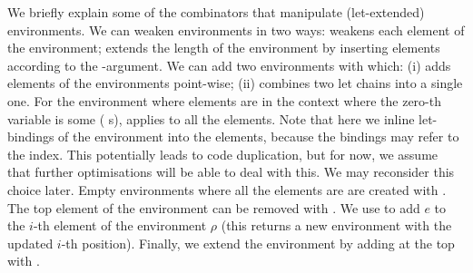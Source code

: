 We briefly explain some of the combinators that manipulate (let-extended) environments.
We can weaken environments in two ways:  weakens each element of the environment;
 extends the length of the environment by inserting 
elements according to the -argument.  We can add two environments with 
which: (i) adds elements of the environments point-wise; (ii) combines two  let
chains into a single one.  For the environment where elements are in the context
where the zero-th variable
is some ( s),  applies  to all the elements.  Note that
here we inline let-bindings of the environment into the elements, because the bindings
may refer to the index.  This potentially leads to code duplication, but for now, we
assume that further optimisations will be able to deal with this.  We may reconsider
this choice later.  Empty environments where all the elements are
 are created with .  The top element of the environment can
be removed with .  We use     to add
$e$ to the $i$-th element of the environment $ρ$ (this returns a new environment 
with the updated $i$-th position).
Finally, we extend the environment by adding  at the top with
.
